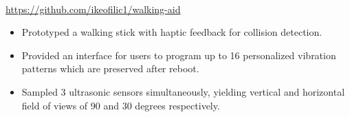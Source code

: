 \\
{\url{https://github.com/ikeofilic1/walking-aid}}
\begin{itemize}
    \item Prototyped a walking stick with haptic feedback for collision detection.
    \item Provided an interface for users to program up to 16 personalized vibration patterns which are preserved after reboot.
    \item Sampled 3 ultrasonic sensors simultaneously, yielding vertical and horizontal field of views of 90 and 30 degrees respectively.
\end{itemize}